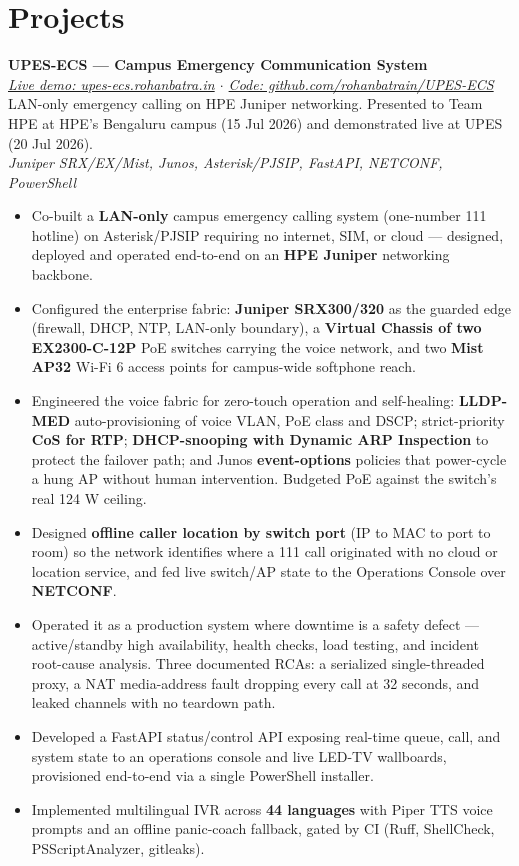 \documentclass[10pt,a4paper]{article}
\newcommand{\entry}[3]{%
  \textbf{#1}\hfill\textit{\small #2}\\[-0.15em]
  {\small #3}\par\vspace{0.08em}%
}
\begin{document}
\section{Projects}
\entry{UPES-ECS --- Campus Emergency Communication System}{}{\textit{\href{https://upes-ecs.rohanbatra.in}{Live demo: upes-ecs.rohanbatra.in} \;$\cdot$\; \href{https://github.com/rohanbatrain/UPES-ECS}{Code: github.com/rohanbatrain/UPES-ECS}}\\ LAN-only emergency calling on HPE Juniper networking. Presented to Team HPE at HPE's Bengaluru campus (15 Jul 2026) and demonstrated live at UPES (20 Jul 2026).\\ \textit{Juniper SRX/EX/Mist, Junos, Asterisk/PJSIP, FastAPI, NETCONF, PowerShell}}
\begin{itemize}
  \item Co-built a \textbf{LAN-only} campus emergency calling system (one-number 111 hotline) on Asterisk/PJSIP requiring no internet, SIM, or cloud --- designed, deployed and operated end-to-end on an \textbf{HPE Juniper} networking backbone.
  \item Configured the enterprise fabric: \textbf{Juniper SRX300/320} as the guarded edge (firewall, DHCP, NTP, LAN-only boundary), a \textbf{Virtual Chassis of two EX2300-C-12P} PoE switches carrying the voice network, and two \textbf{Mist AP32} Wi-Fi 6 access points for campus-wide softphone reach.
  \item Engineered the voice fabric for zero-touch operation and self-healing: \textbf{LLDP-MED} auto-provisioning of voice VLAN, PoE class and DSCP; strict-priority \textbf{CoS for RTP}; \textbf{DHCP-snooping with Dynamic ARP Inspection} to protect the failover path; and Junos \textbf{event-options} policies that power-cycle a hung AP without human intervention. Budgeted PoE against the switch's real 124 W ceiling.
  \item Designed \textbf{offline caller location by switch port} (IP to MAC to port to room) so the network identifies where a 111 call originated with no cloud or location service, and fed live switch/AP state to the Operations Console over \textbf{NETCONF}.
  \item Operated it as a production system where downtime is a safety defect --- active/standby high availability, health checks, load testing, and incident root-cause analysis. Three documented RCAs: a serialized single-threaded proxy, a NAT media-address fault dropping every call at 32 seconds, and leaked channels with no teardown path.
  \item Developed a FastAPI status/control API exposing real-time queue, call, and system state to an operations console and live LED-TV wallboards, provisioned end-to-end via a single PowerShell installer.
  \item Implemented multilingual IVR across \textbf{44 languages} with Piper TTS voice prompts and an offline panic-coach fallback, gated by CI (Ruff, ShellCheck, PSScriptAnalyzer, gitleaks).
\end{itemize}
\end{document}
